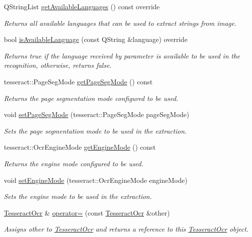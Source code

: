 \begin{DoxyCompactItemize}
Q\+String\+List \mbox{\hyperlink{classTesseractOcr_ad3486dcaa8a478c72ebaf76c43671326}{get\+Available\+Languages}} () const override
\begin{DoxyCompactList}\small\item\em Returns all available languages that can be used to extract strings from image. \end{DoxyCompactList}\item 
bool \mbox{\hyperlink{classTesseractOcr_aefe201ace3b144cb8834931b57f79bfd}{is\+Available\+Language}} (const Q\+String \&language) override
\begin{DoxyCompactList}\small\item\em Returns true if the language received by parameter is available to be used in the recognition, otherwise, returns false. \end{DoxyCompactList}\item 
tesseract\+::\+Page\+Seg\+Mode \mbox{\hyperlink{classTesseractOcr_afd6329838570d29a97834f3c91f0bb2c}{get\+Page\+Seg\+Mode}} () const
\begin{DoxyCompactList}\small\item\em Returns the page segmentation mode configured to be used. \end{DoxyCompactList}\item 
void \mbox{\hyperlink{classTesseractOcr_a16b1a94b0829a668e2f3ebc48c6e9e37}{set\+Page\+Seg\+Mode}} (tesseract\+::\+Page\+Seg\+Mode page\+Seg\+Mode)
\begin{DoxyCompactList}\small\item\em Sets the page segmentation mode to be used in the extraction. \end{DoxyCompactList}\item 
tesseract\+::\+Ocr\+Engine\+Mode \mbox{\hyperlink{classTesseractOcr_a911234ba57781e4e33515e2f0eab4320}{get\+Engine\+Mode}} () const
\begin{DoxyCompactList}\small\item\em Returns the engine mode configured to be used. \end{DoxyCompactList}\item 
void \mbox{\hyperlink{classTesseractOcr_acd714224045f4808b732f865164e1e1a}{set\+Engine\+Mode}} (tesseract\+::\+Ocr\+Engine\+Mode engine\+Mode)
\begin{DoxyCompactList}\small\item\em Sets the engine mode to be used in the extraction. \end{DoxyCompactList}\item 
\mbox{\hyperlink{classTesseractOcr}{Tesseract\+Ocr}} \& \mbox{\hyperlink{classTesseractOcr_ae1327017072b55801ce9ebdbab956b6a}{operator=}} (const \mbox{\hyperlink{classTesseractOcr}{Tesseract\+Ocr}} \&other)
\begin{DoxyCompactList}\small\item\em Assigns other to \mbox{\hyperlink{classTesseractOcr}{Tesseract\+Ocr}} and returns a reference to this \mbox{\hyperlink{classTesseractOcr}{Tesseract\+Ocr}} object. \end{DoxyCompactList}\end{DoxyCompactItemize}
